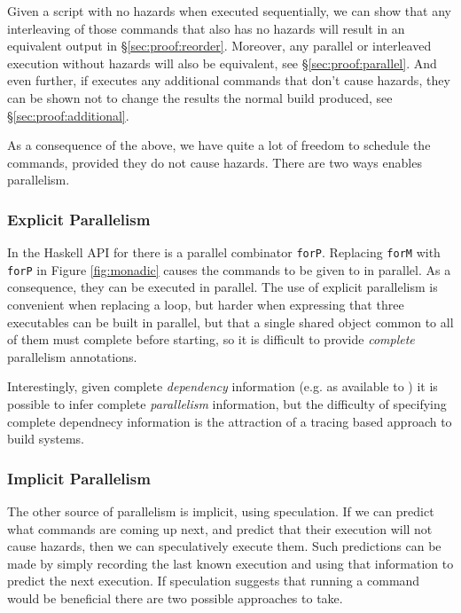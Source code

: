 Given a script with no hazards when executed sequentially, we can show that any interleaving of those commands that also has no hazards will result in an equivalent output in \S\ref{sec:proof:reorder}. Moreover, any parallel or interleaved execution without hazards will also be equivalent, see \S\ref{sec:proof:parallel}. And even further, if \Rattle executes any additional commands that don't cause hazards, they can be shown not to change the results the normal build produced, see \S\ref{sec:proof:additional}.

As a consequence of the above, we have quite a lot of freedom to schedule the commands, provided they do not cause hazards.  There are two ways \Rattle enables parallelism.

\subsubsection{Explicit Parallelism}

In the Haskell API for \Rattle there is a parallel combinator \texttt{forP}. Replacing \texttt{forM} with \texttt{forP} in Figure \ref{fig:monadic} causes the commands to be given to \Rattle in parallel. As a consequence, they can be executed in parallel. The use of explicit parallelism is convenient when replacing a loop, but harder when expressing that three executables can be built in parallel, but that a single shared object common to all of them must complete before starting, so it is difficult to provide \emph{complete} parallelism annotations.

Interestingly, given complete \emph{dependency} information (e.g. as available to \Make) it is possible to infer complete \emph{parallelism} information, but the difficulty of specifying complete dependnecy information is the attraction of a tracing based approach to build systems.

\subsubsection{Implicit Parallelism}
\label{sec:speculation}

The other source of parallelism is implicit, using speculation. If we can predict what commands are coming up next, and predict that their execution will not cause hazards, then we can speculatively execute them.  Such predictions can be made by simply recording the last known execution and using that information to predict the next execution.  If speculation suggests that running a command would be beneficial there are two possible approaches to take.

